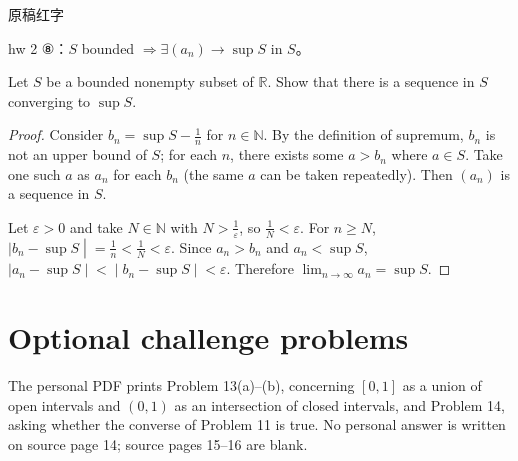 \begin{qlnote}{原稿红字}

hw 2 ⑧：\(S\) bounded \(\Rightarrow\exists\left( a_{n} \right)\rightarrow\sup S\) in \(S\)。

\end{qlnote}

Let \(S\) be a bounded nonempty subset of \(\mathbb{R}\). Show that there is a sequence in \(S\) converging to \(\sup S\).

\begin{proof}

Consider \(b_{n} = \sup S - \frac{1}{n}\) for \(n \in \mathbb{N}\). By the definition of supremum, \(b_{n}\) is not an upper bound of \(S\); for each \(n\), there exists some \(a > b_{n}\) where \(a \in S\). Take one such \(a\) as \(a_{n}\) for each \(b_{n}\) (the same \(a\) can be taken repeatedly). Then \(\left( a_{n} \right)\) is a sequence in \(S\).

Let \(\varepsilon > 0\) and take \(N \in \mathbb{N}\) with \(N > \frac{1}{\varepsilon}\), so \(\frac{1}{N} < \varepsilon\). For \(n \geq N\), \(\left. |b_{n} - \sup S \middle| = \frac{1}{n} < \frac{1}{N} < \varepsilon \right.\). Since \(a_{n} > b_{n}\) and \(a_{n} < \sup S\), \(\left. |a_{n} - \sup S \middle| < \middle| b_{n} - \sup S \middle| < \varepsilon \right.\). Therefore \(\lim_{n\rightarrow\infty}a_{n} = \sup S\).

\end{proof}

\section{Optional challenge problems}

The personal PDF prints Problem 13(a)--(b), concerning \(\left\lbrack {0,1} \right\rbrack\) as a union of open intervals and \(\left( {0,1} \right)\) as an intersection of closed intervals, and Problem 14, asking whether the converse of Problem 11 is true. No personal answer is written on source page 14; source pages 15--16 are blank.

